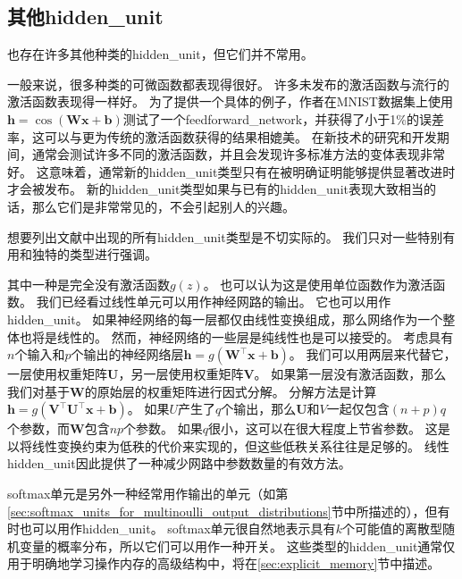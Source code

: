 \subsection{其他\gls{hidden_unit}}
\label{sec:other_hidden_units}

也存在许多其他种类的\gls{hidden_unit}，但它们并不常用。

一般来说，很多种类的可微函数都表现得很好。
许多未发布的激活函数与流行的激活函数表现得一样好。
为了提供一个具体的例子，作者在MNIST数据集上使用$\bm{h}=\cos(\bm{W}\bm{x}+\bm{b})$测试了一个\gls{feedforward_network}，并获得了小于1\%的误差率，这可以与更为传统的激活函数获得的结果相媲美。
在新技术的研究和开发期间，通常会测试许多不同的激活函数，并且会发现许多标准方法的变体表现非常好。
这意味着，通常新的\gls{hidden_unit}类型只有在被明确证明能够提供显著改进时才会被发布。
新的\gls{hidden_unit}类型如果与已有的\gls{hidden_unit}表现大致相当的话，那么它们是非常常见的，不会引起别人的兴趣。

想要列出文献中出现的所有\gls{hidden_unit}类型是不切实际的。
我们只对一些特别有用和独特的类型进行强调。

其中一种是完全没有激活函数$g(z)$。
也可以认为这是使用单位函数作为激活函数。
我们已经看过线性单元可以用作神经网路的输出。
它也可以用作\gls{hidden_unit}。
如果神经网络的每一层都仅由线性变换组成，那么网络作为一个整体也将是线性的。
然而，神经网络的一些层是纯线性也是可以接受的。
考虑具有$n$个输入和$p$个输出的神经网络层$\bm{h}=g(\bm{W}^\top \bm{x}+\bm{b})$。
我们可以用两层来代替它，一层使用权重矩阵$\bm{U}$，另一层使用权重矩阵$\bm{V}$。
如果第一层没有激活函数，那么我们对基于$\bm{W}$的原始层的权重矩阵进行因式分解。
分解方法是计算$\bm{h}=g(\bm{V}^\top \bm{U}^\top \bm{x}+\bm{b})$。
如果$U$产生了$q$个输出，那么$\bm{U}$和$V$一起仅包含$(n+p)q$个参数，而$\bm{W}$包含$np$个参数。
如果$q$很小，这可以在很大程度上节省参数。
这是以将线性变换约束为低秩的代价来实现的，但这些低秩关系往往是足够的。
线性\gls{hidden_unit}因此提供了一种减少网路中参数数量的有效方法。



softmax单元是另外一种经常用作输出的单元（如第\ref{sec:softmax_units_for_multinoulli_output_distributions}节中所描述的），但有时也可以用作\gls{hidden_unit}。
softmax单元很自然地表示具有$k$个可能值的离散型随机变量的概率分布，所以它们可以用作一种开关。
这些类型的\gls{hidden_unit}通常仅用于明确地学习操作内存的高级结构中，将在\ref{sec:explicit_memory}节中描述。

